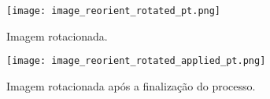 \begin{figure}[!htb]
\centering
\texttt{[image: image\_reorient\_rotated\_pt.png]}
\caption{Imagem rotacionada.}
\label{fig:image_reorient_rotated}
\end{figure}

\begin{figure}[!htb]
\centering
\texttt{[image: image\_reorient\_rotated\_applied\_pt.png]}
\caption{Imagem rotacionada após a finalização do processo.}
\label{fig:image_reorient_rotated_applied}
\end{figure}
